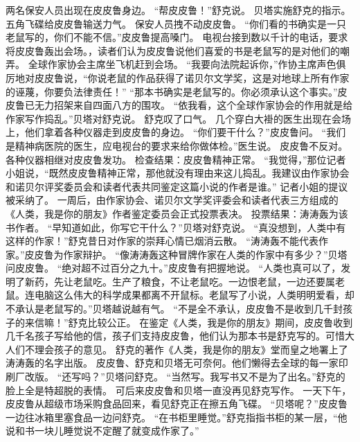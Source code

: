 \documentclass[a4paper,12pt,UTF8,twoside]{ctexbook}
\begin{document}
        两名保安人员出现在皮皮鲁身边。 
        “帮皮皮鲁！”舒克说。 
        贝塔实施舒克的指示。 
        五角飞碟给皮皮鲁输送力气。 
        保安人员拽不动皮皮鲁。 
        “你们看的书确实是一只老鼠写的，你们不能不信。”皮皮鲁提高嗓门。 
        电视台接到数以千计的电话，要求将皮皮鲁轰出会场。，读者们认为皮皮鲁说他们喜爱的书是老鼠写的是对他们的嘲弄。 
        全球作家协会主席坐飞机赶到会场。 
        “我要向法院起诉你，”作协主席声色俱厉地对皮皮鲁说，“你说老鼠的作品获得了诺贝尔文学奖，这是对地球上所有作家的诬蔑，你要负法律责任！” 
        “那本书确实是老鼠写的。你必须承认这个事实。”皮皮鲁已无力招架来自四面八方的围攻。 
        “依我看，这个全球作家协会的作用就是给作家写作捣乱。”贝塔对舒克说。 
        舒克叹了口气。 
        几个穿白大褂的医生出现在会场上，他们拿着各种仪器走到皮皮鲁的身边。 
        “你们要干什么？”皮皮鲁问。 
        “我们是精神病医院的医生，应电视台的要求来给你做体检。”医生说。 
        皮皮鲁不反对。 
        各种仪器相继对皮皮鲁发功。 
        检查结果：皮皮鲁精神正常。 
        “我觉得，”那位记者小姐说，“既然皮皮鲁精神正常，那他就没有理由来这儿捣乱。我建议由作家协会和诺贝尔评奖委员会和读者代表共同鉴定这篇小说的作者是谁。” 
        记者小姐的提议被采纳了。 
        一周后，由作家协会、诺贝尔文学奖评委会和读者代表三方组成的《人类，我是你的朋友》作者鉴定委员会正式投票表决。 
        投票结果：涛涛轰为该书作者。 
        “早知道如此，你写它干什么？”贝塔对舒克说。 
        “真没想到，人类中有这样的作家！”舒克昔日对作家的崇拜心情已烟消云散。 
        “涛涛轰不能代表作家。”皮皮鲁为作家辩护。 
        “像涛涛轰这种冒牌作家在人类的作家中有多少？”贝塔问皮皮鲁。 
        “绝对超不过百分之九十。”皮皮鲁有把握地说。 
        “人类也真可以了，发明了新药，先让老鼠吃。生产了粮食，不让老鼠吃。一边恨老鼠，一边还要属老鼠。连电脑这么伟大的科学成果都离不开鼠标。老鼠写了小说，人类明明爱看，却不承认是老鼠写的。”贝塔越说越有气。 
        “不是全不承认，皮皮鲁不是收到几千封孩子的来信嘛！”舒克比较公正。 
        在鉴定《人类，我是你的朋友》期间，皮皮鲁收到几千名孩子写给他的信，孩子们支持皮皮鲁，他们认为那本书是舒克写的。可惜大人们不理会孩子的意见。 
        舒克的著作《人类，我是你的朋友》堂而皇之地署上了涛涛轰的名字出版。 
        皮皮鲁、舒克和贝塔无可奈何。他们懒得去全球的每一家印刷厂改版。 
        “还写吗？”贝塔问舒克。 
        “当然写。我写书又不是为了出名。”舒克的脸上全是特超脱的表情。 
        可后来皮皮鲁和贝塔一直没再见舒克写作。 
        一天下午，皮皮鲁从超级市场采购食品回来，看见舒克正在擦五角飞碟。 
        “贝塔呢？”皮皮鲁一边往冰箱里塞食品一边问舒克。 
        “在书柜里睡觉。”舒克指指书柜的某一层，“他说和书一块儿睡觉说不定醒了就变成作家了。” 
\end{document}
